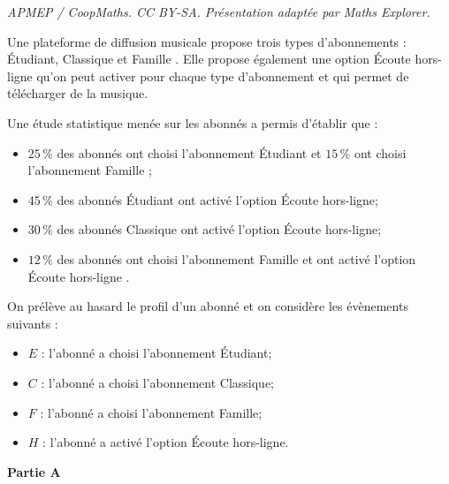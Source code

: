\documentclass[10pt]{article}
\begin{document}
\noindent\textit{APMEP / CoopMaths. CC BY-SA. Présentation adaptée par Maths Explorer.}\par\medskip
Une plateforme de diffusion musicale propose trois types d'abonnements : \og Étudiant\fg{}, \og Classique \fg{} et \og Famille \fg{}. Elle propose également une option \og Écoute hors-ligne \fg{} qu'on peut activer pour chaque type d'abonnement et qui permet de télécharger de la musique.

\smallskip

Une étude statistique menée sur les abonnés a permis d'établir que :
\begin{itemize}
\item $25\,\%$ des abonnés ont choisi l'abonnement \og Étudiant\fg{} et $15\,\%$ ont choisi l'abonnement \og  Famille \fg{};
\item $45\,\%$ des abonnés \og Étudiant\fg{} ont activé l'option \og Écoute hors-ligne\fg{};
\item $30\,\%$ des abonnés \og Classique\fg{} ont activé l'option \og Écoute hors-ligne\fg{};
\item $12\,\%$ des abonnés ont choisi l'abonnement \og Famille\fg{} et ont activé l'option \og Écoute hors-ligne \fg{}.
\end{itemize}

\smallskip

On prélève au hasard le profil d'un abonné et on considère les évènements suivants :

\begin{itemize}
\item $E$ : l'abonné a choisi l'abonnement \og Étudiant\fg{};
\item $C$ : l'abonné a choisi l'abonnement \og Classique\fg{};
\item $F$ : l'abonné a choisi l'abonnement \og Famille\fg{};
\item $H$ : l'abonné a activé l'option \og Écoute hors-ligne\fg{}.
\end{itemize}

\textbf{Partie A}
\end{document}
